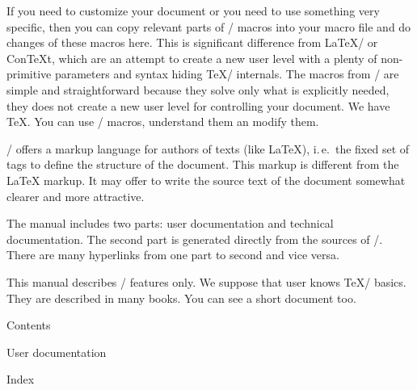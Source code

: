 If you need to customize your document or you need to use something
very specific, then you can copy relevant parts of \OpTeX/ macros into your macro
file and do changes of these macros here. This is significant difference from
\LaTeX/ or ConTeXt, which are an attempt to create a new user level with a
plenty of non-primitive parameters and syntax hiding \TeX/ internals.
The macros from \OpTeX/ are simple and straightforward because they solve only
what is explicitly needed, they does not create a new user level for
controlling your document. We have \TeX.
You can use \OpTeX/ macros, understand them an modify them.

\OpTeX/ offers a markup language for authors of texts (like \LaTeX),
i.\,e.\ the fixed set of tags to define the structure of the document. This
markup is different from the \LaTeX{} markup. It may offer to write the
source text of the document somewhat clearer and more attractive. 

The manual includes two parts: user documentation and technical
documentation. The second part is generated directly from the sources of
\OpTeX/. There are many hyperlinks from one part to second and vice versa.

This manual describes \OpTeX/ features only. We suppose that user knows \TeX/
basics. They are described in many books. You can see a short
document  too.

\vfil\break

  

\notoc\nonum \sec Contents
\maketoc

\chap User documentation


\endgroup




\vfil\break

\def\_printchap#1{\noindent{\_printrefnum[@]\_secfont #1}\medskip}

\nonum\chap Index

 \tt \makeindex \endmulti

\bye
